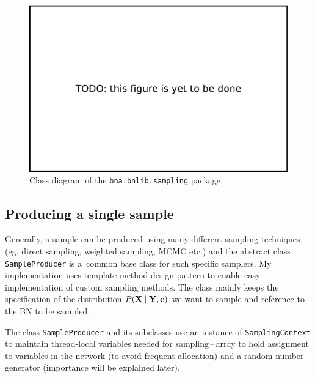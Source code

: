 \documentclass[english,cover]{fitthesis} %
\newcommand{\srccode}[1]{{\tt #1}}         %
\newcommand{\vars}[1]{{\bold{#1}}}         %
\begin{document}
\begin{center}
\begin{figure}[h]
    \begin{center}
    \includegraphics[scale=0.4]{fig/todo}
    \end{center}
    \caption{Class diagram of the \srccode{bna.bnlib.sampling} package.}
    \label{fig:sapling_package_class_diagram}
\end{figure}
\end{center}



\subsection{Producing a single sample}
Generally, a sample can be produced using many different sampling techniques (eg. direct sampling, weighted sampling, MCMC etc.) and the abstract class \srccode{SampleProducer} is a~common base class for such specific samplers. My implementation uses template method design pattern to enable easy implementation of custom sampling methods. The class mainly keeps the specification of the distribution $P(\vars{X} \mid \vars{Y}, \vars{e})$ we want to sample and reference to the BN to be sampled.

The class \srccode{SampleProducer} and its subclasses use an instance of \srccode{SamplingContext} to maintain thread-local variables needed for sampling\,--\,array to hold assignment to variables in the network (to avoid frequent allocation) and a random number generator (importance will be explained later).
\end{document}
